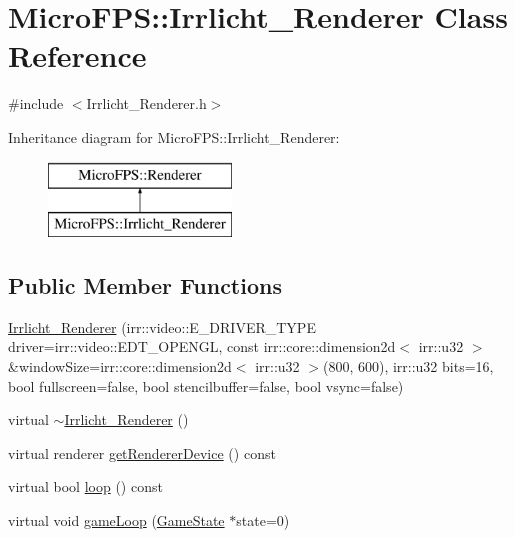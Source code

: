 \hypertarget{class_micro_f_p_s_1_1_irrlicht___renderer}{
\section{MicroFPS::Irrlicht\_\-Renderer Class Reference}
\label{d5/d5b/class_micro_f_p_s_1_1_irrlicht___renderer}
}


{\ttfamily \#include $<$Irrlicht\_\-Renderer.h$>$}

Inheritance diagram for MicroFPS::Irrlicht\_\-Renderer:\begin{figure}[H]
\begin{center}
\leavevmode
\includegraphics[height=2.000000cm]{d5/d5b/class_micro_f_p_s_1_1_irrlicht___renderer}
\end{center}
\end{figure}
\subsection*{Public Member Functions}
\begin{DoxyCompactItemize}
\item 
\hyperlink{class_micro_f_p_s_1_1_irrlicht___renderer_a9310435cb940f83daa7ec4e1b05ae555}{Irrlicht\_\-Renderer} (irr::video::E\_\-DRIVER\_\-TYPE driver=irr::video::EDT\_\-OPENGL, const irr::core::dimension2d$<$ irr::u32 $>$ \&windowSize=irr::core::dimension2d$<$ irr::u32 $>$(800, 600), irr::u32 bits=16, bool fullscreen=false, bool stencilbuffer=false, bool vsync=false)
\item 
virtual \hyperlink{class_micro_f_p_s_1_1_irrlicht___renderer_ab558709a3d5c1e582b00cb16bc3a5205}{$\sim$Irrlicht\_\-Renderer} ()
\item 
virtual renderer \hyperlink{class_micro_f_p_s_1_1_irrlicht___renderer_a6150c60d9599047f2d0ce468d4b3ac56}{getRendererDevice} () const 
\item 
virtual bool \hyperlink{class_micro_f_p_s_1_1_irrlicht___renderer_add10a266706293a2ef5479ecff5a68dd}{loop} () const 
\item 
virtual void \hyperlink{class_micro_f_p_s_1_1_irrlicht___renderer_ad9ec328391c2bf0fef30c60673389cd1}{gameLoop} (\hyperlink{class_micro_f_p_s_1_1_game_state}{GameState} $\ast$state=0)
\end{DoxyCompactItemize}


